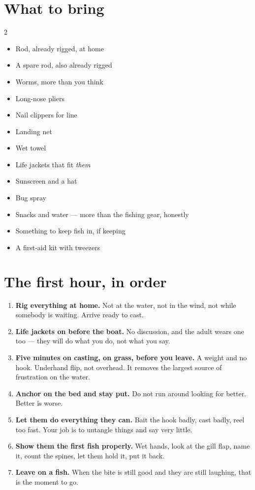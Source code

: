 \section{What to bring}
\begin{multicols}{2}
\begin{itemize}[leftmargin=1.1em,itemsep=0.08em]
\item Rod, already rigged, at home
\item A spare rod, also already rigged
\item Worms, more than you think
\item Long-nose pliers
\item Nail clippers for line
\item Landing net
\item Wet towel
\item Life jackets that fit \emph{them}
\item Sunscreen and a hat
\item Bug spray
\item Snacks and water --- more than the fishing gear, honestly
\item Something to keep fish in, if keeping
\item A first-aid kit with tweezers
\end{itemize}
\end{multicols}

\section{The first hour, in order}
\begin{enumerate}
\item \textbf{Rig everything at home.} Not at the water, not in the wind, not
  while somebody is waiting. Arrive ready to cast.
\item \textbf{Life jackets on before the boat.} No discussion, and the adult
  wears one too --- they will do what you do, not what you say.
\item \textbf{Five minutes on casting, on grass, before you leave.} A weight and
  no hook. Underhand flip, not overhead. It removes the largest source of
  frustration on the water.
\item \textbf{Anchor on the bed and stay put.} Do not run around looking for
  better. Better is worse.
\item \textbf{Let them do everything they can.} Bait the hook badly, cast badly,
  reel too fast. Your job is to untangle things and say very little.
\item \textbf{Show them the first fish properly.} Wet hands, look at the gill
  flap, name it, count the spines, let them hold it, put it back.
\item \textbf{Leave on a fish.} When the bite is still good and they are still
  laughing, that is the moment to go.
\end{enumerate}

